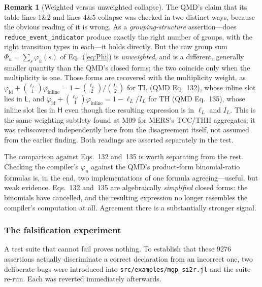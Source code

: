 \documentclass[11pt,leqno]{article}
\newcommand{\code}[1]{\texttt{#1}}
\newcommand{\deme}[1]{\mathsf{#1}}
\theoremstyle{plain}
\theoremstyle{definition}
\newtheorem{remark}[theorem]{Remark}
\begin{document}
\begin{remark}[Weighted versus unweighted collapse]
The QMD's claim that its table lines 1\&2 and lines 4\&5 collapse was
checked in two distinct ways, because the obvious reading of it is wrong.
As a \emph{grouping-structure} assertion---does
\code{reduce\_event\_indicator} produce exactly the right number of groups,
with the right transition types in each---it holds directly.  But the raw
group sum $\Phi_u = \sum_s \varphi_u(s)$ of Eq.~(\ref{eq:Phi}) is
\emph{unweighted}, and is a different, generally smaller quantity than the
QMD's closed forms; the two coincide only when the multiplicity is one.
Those forms are recovered with the multiplicity weight, as
$\varphi_{\text{id}} + \binom{\ell_L}{1}\varphi_{\text{inline}}
 = 1 - \binom{\ell_L}{2}\big/\binom{I_L}{2}$ for TL (QMD Eq.~132), whose
inline slot lies in $\deme{L}$, and
$\varphi_{\text{id}} + \binom{\ell_H}{1}\varphi_{\text{inline}}
 = 1 - \ell_L/I_L$ for TH (QMD Eq.~135), whose inline slot lies in
$\deme{H}$ even though the resulting expression is in $\ell_L$ and $I_L$.
This is the same weighting subtlety
found at M09 for MERS's TCC/THH aggregates; it was rediscovered
independently here from the disagreement itself, not assumed from the
earlier finding.  Both readings are asserted separately in the test.
\end{remark}

The comparison against Eqs.~132 and~135 is worth separating from the rest.
Checking the compiler's $\varphi_u$ against the QMD's product-form
binomial-ratio formulas is, in the end, two implementations of one formula
agreeing---useful, but weak evidence.  Eqs.~132 and~135 are algebraically
\emph{simplified} closed forms: the binomials have cancelled, and the
resulting expression no longer resembles the compiler's computation at all.
Agreement there is a substantially stronger signal.

\subsubsection{The falsification experiment}

A test suite that cannot fail proves nothing.  To establish that these 9276
assertions actually discriminate a correct declaration from an incorrect
one, two deliberate bugs were introduced into
\code{src/examples/mgp\_si2r.jl} and the suite re-run.  Each was reverted
immediately afterwards.
\end{document}
